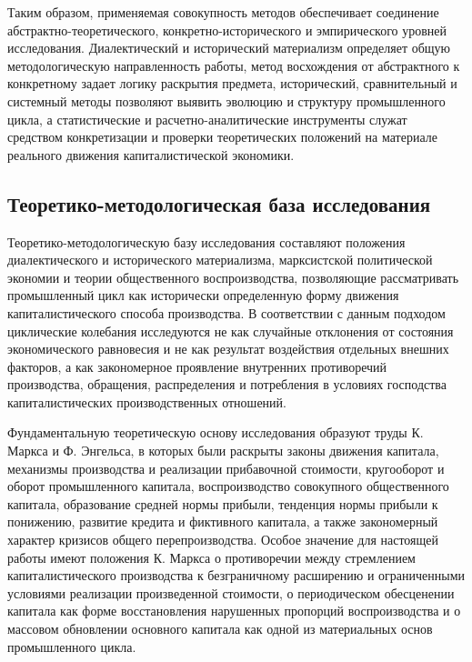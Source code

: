 Таким образом, применяемая совокупность методов обеспечивает соединение абстрактно-теоретического, конкретно-исторического и эмпирического уровней исследования. Диалектический и исторический материализм определяет общую методологическую направленность работы, метод восхождения от абстрактного к конкретному задает логику раскрытия предмета, исторический, сравнительный и системный методы позволяют выявить эволюцию и структуру промышленного цикла, а статистические и расчетно-аналитические инструменты служат средством конкретизации и проверки теоретических положений на материале реального движения капиталистической экономики.

\subsection*{Теоретико-методологическая база исследования}
Теоретико-методологическую базу исследования составляют положения диалектического и исторического материализма, марксистской политической экономии и теории общественного воспроизводства, позволяющие рассматривать промышленный цикл как исторически определенную форму движения капиталистического способа производства. В соответствии с данным подходом циклические колебания исследуются не как случайные отклонения от состояния экономического равновесия и не как результат воздействия отдельных внешних факторов, а как закономерное проявление внутренних противоречий производства, обращения, распределения и потребления в условиях господства капиталистических производственных отношений.

Фундаментальную теоретическую основу исследования образуют труды К. Маркса и Ф. Энгельса, в которых были раскрыты законы движения капитала, механизмы производства и реализации прибавочной стоимости, кругооборот и оборот промышленного капитала, воспроизводство совокупного общественного капитала, образование средней нормы прибыли, тенденция нормы прибыли к понижению, развитие кредита и фиктивного капитала, а также закономерный характер кризисов общего перепроизводства. Особое значение для настоящей работы имеют положения К. Маркса о противоречии между стремлением капиталистического производства к безграничному расширению и ограниченными условиями реализации произведенной стоимости, о периодическом обесценении капитала как форме восстановления нарушенных пропорций воспроизводства и о массовом обновлении основного капитала как одной из материальных основ промышленного цикла.

